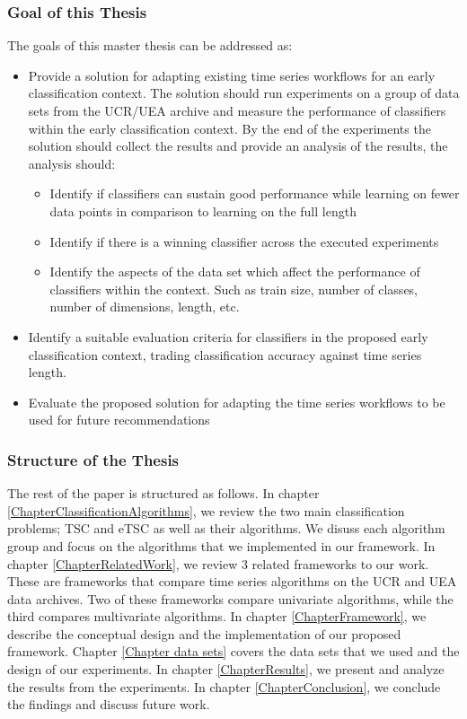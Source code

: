 \subsubsection*{Goal of this Thesis}
\label{thesisGoals}
The goals of this master thesis can be addressed as:

\begin{itemize}
    \item Provide a solution for adapting existing time series workflows for an early classification context. The solution should run experiments on a group of data sets from the UCR/UEA archive and measure the performance of classifiers within the early classification context. By the end of the experiments the solution should collect the results and provide an analysis of the results, the analysis should:
    \begin{itemize}
        \item Identify if classifiers can sustain good performance while learning on fewer data points in comparison to learning on the full length
        \item Identify if there is a winning classifier across the executed experiments
        \item Identify the aspects of the data set which affect the performance of classifiers within the context. Such as train size, number of classes, number of dimensions, length, etc.
    \end{itemize}
    \item Identify a suitable evaluation criteria for classifiers in the proposed early classification context, trading classification accuracy against time series length.
    \item Evaluate the proposed solution for adapting the time series workflows to be used for future recommendations
\end{itemize}

\subsubsection*{Structure of the Thesis}
\label{thesisStructure}
The rest of the paper is structured as follows. In chapter \ref{ChapterClassificationAlgorithms}, we review the two main classification problems;
TSC and eTSC as well as their algorithms. We disuss each algorithm group and focus on the algorithms that we implemented in our framework.
In chapter \ref{ChapterRelatedWork}, we review 3 related frameworks to our work. These are frameworks that compare time series algorithms on the UCR and UEA data archives.
Two of these frameworks compare univariate algorithms, while the third compares multivariate algorithms.
In chapter \ref{ChapterFramework}, we describe the conceptual design and the implementation of our proposed framework.
Chapter \ref{Chapter data sets} covers the data sets that we used and the design of our experiments.
In chapter \ref{ChapterResults}, we present and analyze the results from the experiments.
In chapter \ref{ChapterConclusion}, we conclude the findings and discuss future work.